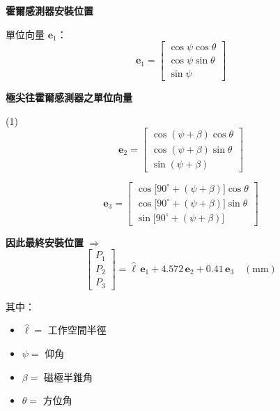 \documentclass[12pt]{article}
\begin{document}
{\large\textbf{霍爾感測器安裝位置}}

\medskip
單位向量 $\mathbf{e}_1$：
\[
\mathbf{e}_1 =
\begin{bmatrix}
\cos\psi\cos\theta \\[2pt]
\cos\psi\sin\theta \\[2pt]
\sin\psi
\end{bmatrix}
\]

\vspace{1em}

{\large\textbf{極尖往霍爾感測器之單位向量}}

\medskip
(1)\quad
\[
\mathbf{e}_2 =
\begin{bmatrix}
\cos(\psi+\beta)\cos\theta \\[2pt]
\cos(\psi+\beta)\sin\theta \\[2pt]
\sin(\psi+\beta)
\end{bmatrix}
\]

\[
\mathbf{e}_3 =
\begin{bmatrix}
\cos\!\big[90^\circ+(\psi+\beta)\big]\cos\theta \\[2pt]
\cos\!\big[90^\circ+(\psi+\beta)\big]\sin\theta \\[2pt]
\sin\!\big[90^\circ+(\psi+\beta)\big]
\end{bmatrix}
\]

\vspace{1em}

{\large\textbf{因此最終安裝位置}} $\Rightarrow$
\[
\begin{bmatrix} P_1 \\ P_2 \\ P_3 \end{bmatrix}
= \hat{\ell}\,\mathbf{e}_1 + 4.572\,\mathbf{e}_2 + 0.41\,\mathbf{e}_3 \quad (\mathrm{mm})
\]

其中：
\begin{itemize}[leftmargin=2.5em,topsep=2pt,itemsep=1pt]
  \item $\hat{\ell} = $ 工作空間半徑
  \item $\psi = $ 仰角
  \item $\beta = $ 磁極半錐角
  \item $\theta = $ 方位角
\end{itemize}
\end{document}
